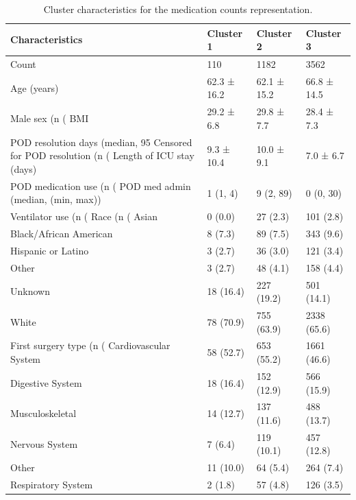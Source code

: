 \begin{table}

\caption{Cluster characteristics for the medication counts representation.}
\centering
\begin{tabular}[t]{llll}
\toprule
Characteristics & Cluster 1 & Cluster 2 & Cluster 3\\
\midrule
Count & 110 & 1182 & 3562\\
Age (years) & 62.3 ± 16.2 & 62.1 ± 15.2 & 66.8 ± 14.5\\
Male sex (n (%
BMI & 29.2 ± 6.8 & 29.8 ± 7.7 & 28.4 ± 7.3\\
POD resolution days (median, 95%
\addlinespace
Censored for POD resolution (n (%
Length of ICU stay (days) & 9.3 ± 10.4 & 10.0 ± 9.1 & 7.0 ± 6.7\\
POD medication use (n (%
POD med admin (median, (min, max)) & 1 (1, 4) & 9 (2, 89) & 0 (0, 30)\\
Ventilator use (n (%
\addlinespace
Race (n (%
Asian & 0 (0.0) & 27 (2.3) & 101 (2.8)\\
Black/African American & 8 (7.3) & 89 (7.5) & 343 (9.6)\\
Hispanic or Latino & 3 (2.7) & 36 (3.0) & 121 (3.4)\\
Other & 3 (2.7) & 48 (4.1) & 158 (4.4)\\
\addlinespace
Unknown & 18 (16.4) & 227 (19.2) & 501 (14.1)\\
White & 78 (70.9) & 755 (63.9) & 2338 (65.6)\\
First surgery type (n (%
Cardiovascular System & 58 (52.7) & 653 (55.2) & 1661 (46.6)\\
Digestive System & 18 (16.4) & 152 (12.9) & 566 (15.9)\\
\addlinespace
Musculoskeletal & 14 (12.7) & 137 (11.6) & 488 (13.7)\\
Nervous System & 7 (6.4) & 119 (10.1) & 457 (12.8)\\
Other & 11 (10.0) & 64 (5.4) & 264 (7.4)\\
Respiratory System & 2 (1.8) & 57 (4.8) & 126 (3.5)\\

\end{tabular}
\end{table}
